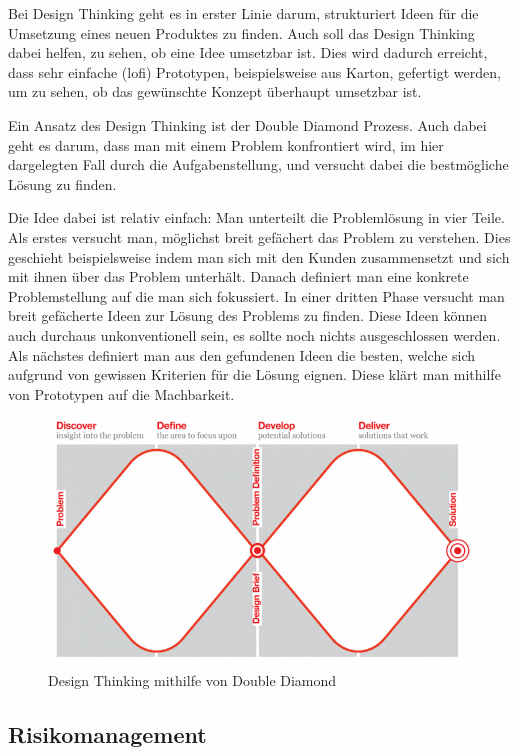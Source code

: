 Bei Design Thinking \cite{Wikipedia-Design-Thinking} geht es in erster Linie darum, strukturiert 
Ideen für die Umsetzung eines neuen Produktes zu finden. Auch soll das Design Thinking
dabei helfen, zu sehen, ob eine Idee umsetzbar ist. Dies wird dadurch erreicht,
dass sehr einfache (\acrshort{lofi}) Prototypen, beispielsweise aus Karton, 
gefertigt werden, um zu sehen, ob das gewünschte Konzept überhaupt umsetzbar ist.

Ein Ansatz des Design Thinking ist der Double Diamond Prozess. Auch dabei geht es
darum, dass man mit einem Problem konfrontiert wird, im hier dargelegten Fall durch die 
Aufgabenstellung, und versucht dabei die bestmögliche Lösung zu finden.

Die Idee dabei ist relativ einfach: Man unterteilt die Problemlösung in vier Teile.
Als erstes versucht man, möglichst breit gefächert das Problem zu verstehen. Dies geschieht
beispielsweise indem man sich mit den Kunden zusammensetzt und sich mit ihnen über das Problem unterhält.
Danach definiert man eine konkrete Problemstellung auf die man sich fokussiert.
In einer dritten Phase versucht man breit gefächerte Ideen zur Lösung des Problems zu finden.
Diese Ideen können auch durchaus unkonventionell sein, es sollte noch nichts ausgeschlossen werden.
Als nächstes definiert man aus den gefundenen Ideen
die besten, welche sich aufgrund von gewissen Kriterien für die Lösung eignen.
Diese klärt man mithilfe von Prototypen auf die Machbarkeit.
\begin{figure}[H]
  \includegraphics[width=1.0\textwidth]{img/Aufgabenstellung/double-diamond.png}
  \centering
  \caption{Design Thinking mithilfe von Double Diamond}
\end{figure}
  
\subsection{Risikomanagement}
\label{sec:risikomanagement}

